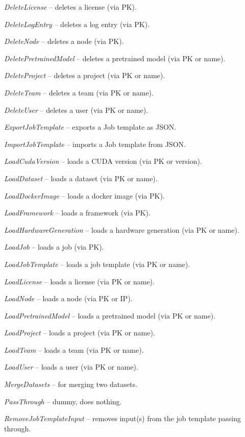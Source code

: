 \documentclass[a4paper]{book}
\begin{document}
\begin{tight_itemize}
  \item \textit{DeleteLicense} -- deletes a license (via PK).
  \item \textit{DeleteLogEntry} -- deletes a log entry (via PK).
  \item \textit{DeleteNode} -- deletes a node (via PK).
  \item \textit{DeletePretrainedModel} -- deletes a pretrained model (via PK or name).
  \item \textit{DeleteProject} -- deletes a project (via PK or name).
  \item \textit{DeleteTeam} -- deletes a team (via PK or name).
  \item \textit{DeleteUser} -- deletes a user (via PK or name).
  \item \textit{ExportJobTemplate} -- exports a Job template as JSON.
  \item \textit{ImportJobTemplate} -- imports a Job template from JSON.
  \item \textit{LoadCudaVersion} -- loads a CUDA version (via PK or version).
  \item \textit{LoadDataset} -- loads a dataset (via PK or name).
  \item \textit{LoadDockerImage} -- loads a docker image (via PK).
  \item \textit{LoadFramework} -- loads a framework (via PK).
  \item \textit{LoadHardwareGeneration} -- loads a hardware generation (via PK or name).
  \item \textit{LoadJob} -- loads a job (via PK).
  \item \textit{LoadJobTemplate} -- loads a job template (via PK or name).
  \item \textit{LoadLicense} -- loads a license (via PK or name).
  \item \textit{LoadNode} -- loads a node (via PK or IP).
  \item \textit{LoadPretrainedModel} -- loads a pretrained model (via PK or name).
  \item \textit{LoadProject} -- loads a project (via PK or name).
  \item \textit{LoadTeam} -- loads a team (via PK or name).
  \item \textit{LoadUser} -- loads a user (via PK or name).
  \item \textit{MergeDatasets} -- for merging two datasets.
  \item \textit{PassThrough} -- dummy, does nothing.
  \item \textit{RemoveJobTemplateInput} -- removes input(s) from the job template passing through.

\end{tight_itemize}
\end{document}
